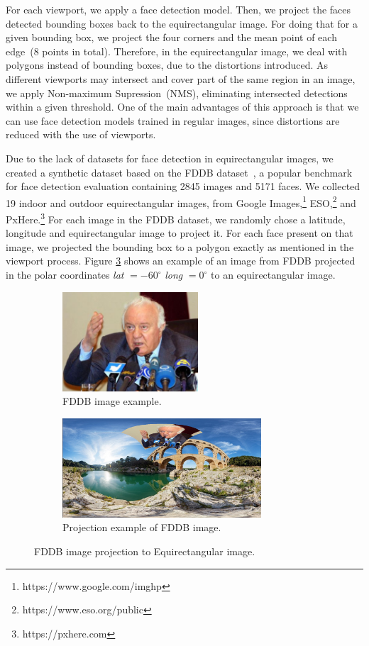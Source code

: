 For each viewport, we apply a face detection model. 
Then, we project the faces detected bounding boxes back to the equirectangular image. For doing that for a given bounding box, we project the four corners and the mean point of each edge~(8 points in total). Therefore, in the equirectangular image, we deal with polygons instead of bounding boxes, due to the distortions introduced. As different viewports may intersect and cover part of the same region in an image, we apply Non-maximum Supression~(NMS), eliminating intersected detections within a given threshold. One of the main advantages of this approach is that we can use face detection models trained in regular images, since distortions are reduced with the use of viewports.

Due to the lack of datasets for face detection in equirectangular images, we created a synthetic dataset based on the FDDB dataset~\cite{fddbTech}, a popular benchmark for face detection evaluation containing 2845 images and 5171 faces. We collected 19 indoor and outdoor equirectangular images, from Google Images,\footnote{https://www.google.com/imghp} ESO,\footnote{https://www.eso.org/public} and PxHere.\footnote{https://pxhere.com}
For each image in the FDDB dataset, we randomly chose a latitude, longitude and equirectangular image to project it. For each face present on that image, we projected the bounding box to a polygon exactly as mentioned in the viewport process. Figure \ref{fig:fddb_proj} shows an example of an image from FDDB projected in the polar coordinates \emph{lat} $ = -60^{\circ}$ \emph{long} $= 0^{\circ}$ to an equirectangular image.

\begin{figure}[!ht]
\centering
    \begin{subfigure}{0.4\linewidth}
        \centering
        \includegraphics[height=10em]{img/face_pre.png}
        \caption{FDDB image example.}
        \label{subfig:face_pre}
    \end{subfigure}\hfill
    \begin{subfigure}{0.55\linewidth}
        \centering
        \includegraphics[height=10em]{img/face_pos.png}
        \caption{Projection example of FDDB image.}
        \label{subfig:face_pos}
    \end{subfigure}

\caption{FDDB image projection to Equirectangular image.}
\label{fig:fddb_proj}
\end{figure}


